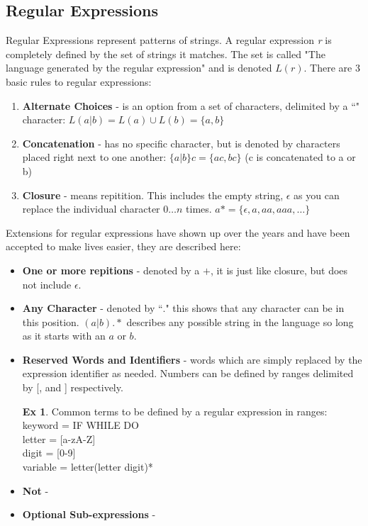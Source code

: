 \documentclass{report}
\theoremstyle{definition}
\newtheorem*{examp}{Ex}
\begin{document}
		\subsection{Regular Expressions}
			Regular Expressions represent patterns of strings. A regular expression \textit{r} is completely defined by the set of 
			strings it matches. The set is called "The language generated by the regular expression" and is denoted $L(r)$.
			There are 3 basic rules to regular expressions:
			\begin{enumerate}
				\item \textbf{Alternate Choices} - is an option from a set of characters, delimited by a ``\textbar" character:
					$L(a|b) = L(a) \cup L(b) = \{a, b\}$
				\item \textbf{Concatenation} - has no specific character, but is denoted by characters placed right 
					next to one another: $\{a|b\}c = \{ac, bc\}$ (c is concatenated to a or b)
				\item \textbf{Closure} - means repitition. This includes the empty string, $\epsilon$  as you can replace the 
					individual character $0\dots n$ times. $a* = \{\epsilon, a, aa, aaa, \dots\}$
			\end{enumerate}
			Extensions for regular expressions have shown up over the years and have been accepted to make lives easier, they are
			described here:
			\begin{itemize}
				\item \textbf{One or more repitions} - denoted by a $+$, it is just like closure, but does not include $\epsilon$.
				\item \textbf{Any Character} - denoted by ``$.$" this shows that any character can be in this position. 
					$(a|b).*$ describes any possible string in the language so long as it starts with an $a$ or $b$. 
				\item \textbf{Reserved Words and Identifiers} - words which are simply replaced by the expression identifier as needed.
					Numbers can be defined by ranges delimited by [, and ] respectively.
					\begin{examp} 
						Common terms to be defined by a regular expression in ranges: \\
						keyword = IF \textbar WHILE \textbar DO \\
						letter = [a-zA-Z] \\
						digit = [0-9] \\
						variable = letter(letter \textbar digit)*
					\end{examp}
				\item \textbf{Not} - 
				\item \textbf{Optional Sub-expressions} - 
			\end{itemize}
\end{document}
